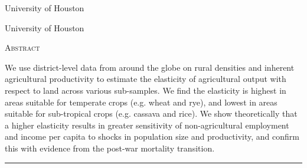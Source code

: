 \documentclass[11pt]{article}
\begin{document}
\begin{titlepage}
\vspace{2in} \noindent {\large \today}

\vspace{.5in} 

\vspace{.25in} 

\vspace{.05in} \noindent University of Houston

\vspace{.25in} 

\vspace{.05in} \noindent University of Houston

\vfill \noindent \textsc{Abstract} \hrulefill

\vspace{.05in} \noindent We use district-level data from around the globe on rural densities and inherent agricultural productivity to estimate the elasticity of agricultural output with respect to land across various sub-samples. We find the elasticity is highest in areas suitable for temperate crops (e.g. wheat and rye), and lowest in areas suitable for sub-tropical crops (e.g. cassava and rice). We show theoretically that a higher elasticity results in greater sensitivity of non-agricultural employment and income per capita to shocks in population size and productivity, and confirm this with evidence from the post-war mortality transition.

\vspace{.1in} \hrule

\vspace{.5in} 

\vspace{.1in} 

\vspace{.1in} 
\end{titlepage}
\end{document}
